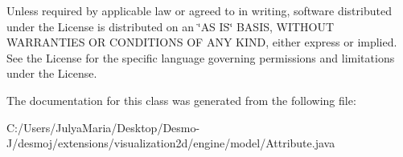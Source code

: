 Unless required by applicable law or agreed to in writing, software distributed under the License is distributed on an \char`\"{}\-A\-S I\-S\char`\"{} B\-A\-S\-I\-S, W\-I\-T\-H\-O\-U\-T W\-A\-R\-R\-A\-N\-T\-I\-E\-S O\-R C\-O\-N\-D\-I\-T\-I\-O\-N\-S O\-F A\-N\-Y K\-I\-N\-D, either express or implied. See the License for the specific language governing permissions and limitations under the License. 

The documentation for this class was generated from the following file\-:\begin{DoxyCompactItemize}
\item 
C\-:/\-Users/\-Julya\-Maria/\-Desktop/\-Desmo-\/\-J/desmoj/extensions/visualization2d/engine/model/Attribute.\-java\end{DoxyCompactItemize}
